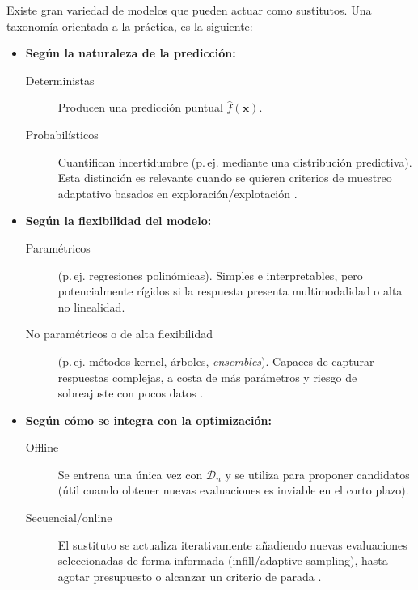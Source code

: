 \medskip
\noindent Existe gran variedad de modelos que pueden actuar como sustitutos. Una taxonomía orientada a la práctica, es la siguiente:
\begin{itemize}
  \item \textbf{Según la naturaleza de la predicción:}
  \begin{description}
    \item [Deterministas] Producen una predicción puntual $\hat{f}(\bm{x})$.
    \item [Probabilísticos] Cuantifican incertidumbre (p.\,ej. mediante una
    distribución predictiva). Esta distinción es relevante cuando se quieren criterios de
    muestreo adaptativo basados en exploración/explotación \cite{forrester2008engineering,jiang2020surrogate}.
  \end{description}

  \item \textbf{Según la flexibilidad del modelo:}
  \begin{description}
    \item [Paramétricos] (p.\,ej. regresiones polinómicas). Simples e interpretables, pero
    potencialmente rígidos si la respuesta presenta multimodalidad o alta no linealidad.
    \item [No paramétricos o de alta flexibilidad] (p.\,ej. métodos kernel, árboles, \emph{ensembles}).
    Capaces de capturar respuestas complejas, a costa de más parámetros y riesgo de sobreajuste
    con pocos datos \cite{forrester2008engineering}.
  \end{description}

  \item \textbf{Según cómo se integra con la optimización:}
  \begin{description}
    \item[Offline] Se entrena una única vez con $\mathcal{D}_n$ y se utiliza para proponer
    candidatos (útil cuando obtener nuevas evaluaciones es inviable en el corto plazo).
    \item[Secuencial/online] El sustituto se actualiza iterativamente añadiendo nuevas
    evaluaciones seleccionadas de forma informada (infill/adaptive sampling), hasta agotar presupuesto
    o alcanzar un criterio de parada \cite{forrester2008engineering,jiang2020surrogate}.
  \end{description}
\end{itemize}


